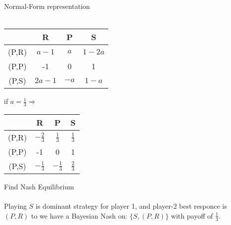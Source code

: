 \documentclass[
  course = {{IE579 Game Theory and Multi-Agent Reinforcement Learning}},
  quartile = {{4}},
  assignment = 2,
  name = {{Mohammad Mahdi Rahimi}},
  studentnumber = {{20208244}},
  email = {{mahi@kaist.ac.kr}},
  firstexercise = 1
]{aga-homework}
\begin{document}
\subexercise Normal-Form representation
\\\\
\begin{center}
\begin{tabular}{ |c|c|c|c| } 
\hline 
 & R & P & S \\
\hline
(P,R) & $a - 1$ & $a$ & $1 - 2a$ \\ 
\hline
(P,P) & -1 & 0 & 1 \\ 
\hline
(P,S) & $2a - 1$ & $-a$ & $1 - a$ \\ 
\hline
\end{tabular}   if $a = \frac{1}{3} \Rightarrow$
\begin{tabular}{ |c|c|c|c| } 
\hline 
 & R & P & S \\
\hline
(P,R) & $-\frac{2}{3}$ & $\frac{1}{3}$ & $\frac{1}{3}$ \\ 
\hline
(P,P) & -1 & 0 & 1 \\ 
\hline
(P,S) & $-\frac{1}{3}$ & $-\frac{1}{3}$ & $\frac{2}{3}$ \\ 
\hline
\end{tabular}    
\end{center}

\subexercise Find Nash Equilibrium
\\\\
Playing $S$ is dominant strategy for player 1, and player-2 best responce is $(P,R)$ to we have a Bayesian Nash on: $\{S, (P,R)\}$ with payoff of $\frac{1}{3}$.
\end{document}
